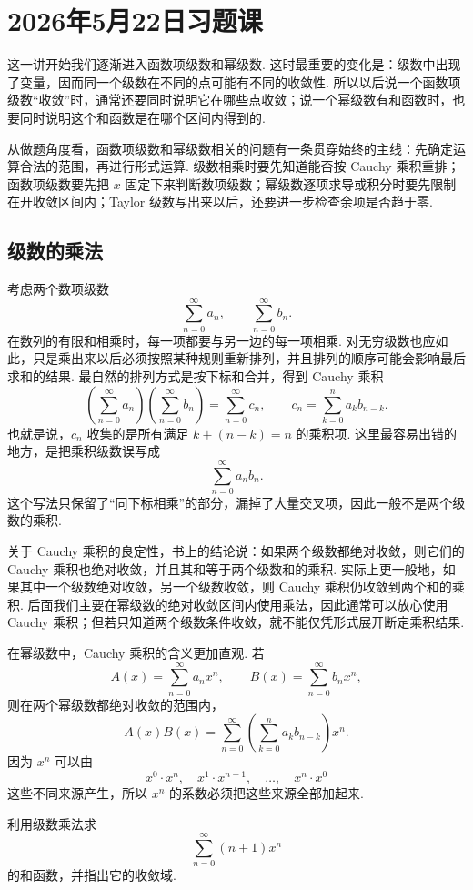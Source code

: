 \documentclass{ctexart}
\newcounter{EnvironmentCounter}
\newcommand{\renewEnvironmentCounter}{\setcounter{EnvironmentCounter}{0}}
\begin{document}
\clearpage
\renewEnvironmentCounter
\section{2026年5月22日习题课}
这一讲开始我们逐渐进入函数项级数和幂级数. 这时最重要的变化是：级数中出现了变量，因而同一个级数在不同的点可能有不同的收敛性. 所以以后说一个函数项级数“收敛”时，通常还要同时说明它在哪些点收敛；说一个幂级数有和函数时，也要同时说明这个和函数是在哪个区间内得到的.

从做题角度看，函数项级数和幂级数相关的问题有一条贯穿始终的主线：先确定运算合法的范围，再进行形式运算. 级数相乘时要先知道能否按 Cauchy 乘积重排；函数项级数要先把 $x$ 固定下来判断数项级数；幂级数逐项求导或积分时要先限制在开收敛区间内；Taylor 级数写出来以后，还要进一步检查余项是否趋于零.

\subsection{级数的乘法}

考虑两个数项级数
$$\sum_{n=0}^{\infty}a_n,\qquad \sum_{n=0}^{\infty}b_n.$$
在数列的有限和相乘时，每一项都要与另一边的每一项相乘. 对无穷级数也应如此，只是乘出来以后必须按照某种规则重新排列，并且排列的顺序可能会影响最后求和的结果. 最自然的排列方式是按下标和合并，得到 Cauchy 乘积
\[
\left(\sum_{n=0}^{\infty}a_n\right)
\left(\sum_{n=0}^{\infty}b_n\right)
=
\sum_{n=0}^{\infty}c_n,
\qquad
c_n=\sum_{k=0}^{n}a_kb_{n-k}.
\]
也就是说，$c_n$ 收集的是所有满足 $k+(n-k)=n$ 的乘积项. 这里最容易出错的地方，是把乘积级数误写成
\[
\sum_{n=0}^{\infty}a_nb_n.
\]
这个写法只保留了“同下标相乘”的部分，漏掉了大量交叉项，因此一般不是两个级数的乘积.

关于 Cauchy 乘积的良定性，书上的结论说：如果两个级数都绝对收敛，则它们的 Cauchy 乘积也绝对收敛，并且其和等于两个级数和的乘积. 实际上更一般地，如果其中一个级数绝对收敛，另一个级数收敛，则 Cauchy 乘积仍收敛到两个和的乘积. 后面我们主要在幂级数的绝对收敛区间内使用乘法，因此通常可以放心使用 Cauchy 乘积；但若只知道两个级数条件收敛，就不能仅凭形式展开断定乘积结果.

在幂级数中，Cauchy 乘积的含义更加直观. 若
\[
A(x)=\sum_{n=0}^{\infty}a_nx^n,
\qquad
B(x)=\sum_{n=0}^{\infty}b_nx^n,
\]
则在两个幂级数都绝对收敛的范围内，
\[
A(x)B(x)
=
\sum_{n=0}^{\infty}\left(\sum_{k=0}^{n}a_kb_{n-k}\right)x^n.
\]
因为 $x^n$ 可以由
\[
x^0\cdot x^n,\quad x^1\cdot x^{n-1},\quad \ldots,\quad x^n\cdot x^0
\]
这些不同来源产生，所以 $x^n$ 的系数必须把这些来源全部加起来.

\begin{example}
利用级数乘法求
\[
\sum_{n=0}^{\infty}(n+1)x^n
\]
的和函数，并指出它的收敛域.
\end{example}
\end{document}
